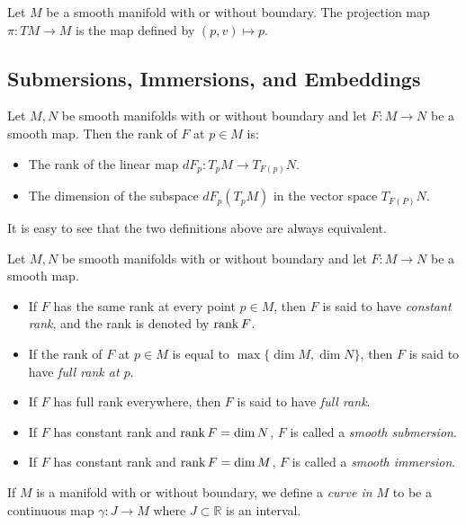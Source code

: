 \begin{defn}
  Let $M$ be a smooth manifold with or without boundary.
  The projection map $\pi: TM \rightarrow M$ is the map defined by $(p, v) \mapsto p$.
\end{defn}

\subsection{Submersions, Immersions, and Embeddings}

\begin{defn}[Rank]
  Let $M, N$ be smooth manifolds with or without boundary and let $F: M \rightarrow N$ be a smooth map.
  Then the rank of $F$ at $p \in M$ is:
  \begin{itemize}
    \item
      The rank of the linear map $dF_p: T_pM \rightarrow T_{F(p)}N$.
    \item
      The dimension of the subspace $dF_p(T_pM)$ in the vector space $T_{F(P)}N$.
  \end{itemize}
  It is easy to see that the two definitions above are always equivalent.
\end{defn}

\begin{defn}
  Let $M, N$ be smooth manifolds with or without boundary and let $F: M \rightarrow N$ be a smooth map.
  \begin{itemize}
    \item
      If $F$ has the same rank at every point $p \in M$, then $F$ is said to have \textit{constant rank}, and the rank is denoted by $\rank F$.
    \item
      If the rank of $F$ at $p \in M$ is equal to $\max \{ \dim M, \dim N \}$, then $F$ is said to have \textit{full rank at $p$}.
    \item
      If $F$ has full rank everywhere, then $F$ is said to have \textit{full rank}.
    \item
      If $F$ has constant rank and $\rank F = \dim N$, $F$ is called a \textit{smooth submersion}.
    \item
      If $F$ has constant rank and $\rank F = \dim M$, $F$ is called a \textit{smooth immersion}.
  \end{itemize}
\end{defn}

\begin{defn}[Curve]
  If $M$ is a manifold with or without boundary, we define a \textit{curve in $M$} to be a continuous map $\gamma: J \rightarrow M$ where $J \subset \mathbb{R}$ is an interval.
\end{defn}
